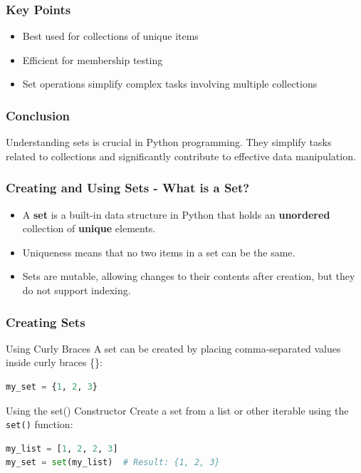 \documentclass{beamer}
\begin{document}
\begin{frame}
    \frametitle{Key Points}
    \begin{itemize}
        \item Best used for collections of unique items
        \item Efficient for membership testing
        \item Set operations simplify complex tasks involving multiple collections
    \end{itemize}
\end{frame}

\begin{frame}
    \frametitle{Conclusion}
    Understanding sets is crucial in Python programming. They simplify tasks related to collections and significantly contribute to effective data manipulation.
\end{frame}

\begin{frame}[fragile]
    \frametitle{Creating and Using Sets - What is a Set?}
    \begin{itemize}
        \item A \textbf{set} is a built-in data structure in Python that holds an \textbf{unordered} collection of \textbf{unique} elements.
        \item Uniqueness means that no two items in a set can be the same.
        \item Sets are mutable, allowing changes to their contents after creation, but they do not support indexing.
    \end{itemize}
\end{frame}

\begin{frame}[fragile]
    \frametitle{Creating Sets}
    \begin{block}{Using Curly Braces}
        A set can be created by placing comma-separated values inside curly braces \{\}:
        \begin{lstlisting}[language=Python]
my_set = {1, 2, 3}
        \end{lstlisting}
    \end{block}

    \begin{block}{Using the set() Constructor}
        Create a set from a list or other iterable using the \texttt{set()} function:
        \begin{lstlisting}[language=Python]
my_list = [1, 2, 2, 3]
my_set = set(my_list)  # Result: {1, 2, 3}
        \end{lstlisting}
    \end{block}
\end{frame}
\end{document}
